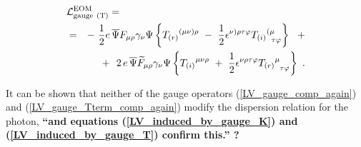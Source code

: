 \documentclass[paper,12pt]{revtex4}
\begin{document}
\begin{eqnarray}
\nonumber
        \lefteqn{
        \mathcal{L}_{\rm gauge\ (T)}^{\rm EOM} = } \\
\label{LV_induced_by_gauge_T}
	& = &
	-~ \frac{1}{2} e \, \overline{\Psi} F_{\mu\rho} 
	                    \gamma_\nu \Psi 
	\left\{
	{T_{(r)}}^{(\mu\nu)\rho} 
	~-~
	\frac{1}{2} \epsilon^{\nu)\rho\tau\varphi}
	{T_{(i)}}^{(\mu}_{\phantom{\mu}\tau\varphi}
	\right\}
	~~+
	\\
\nonumber
	&&
	+~~
	2\, 
	e\, \overline{\Psi} \widetilde{F}_{\mu\rho}
	        \gamma_\nu \Psi
	\left\{
	   {T_{(i)}}^{\mu\nu\rho} 
	   ~+~
	   \frac{1}{2} \epsilon^{\nu\rho\tau\varphi}
	   {T_{(r)}}^\mu_{\phantom{\mu}\tau\varphi}
	\right\}~.
\end{eqnarray}

	It can be shown 
\cite{GrootNibbelink:2004za}
	that neither of the gauge operators 
	(\ref{LV_gauge_comp_again}) and
	(\ref{LV_gauge_Tterm_comp_again}) 
	modify the dispersion relation for the photon,
	{\bf ``and equations (\ref{LV_induced_by_gauge_K})
	  and (\ref{LV_induced_by_gauge_T}) confirm this.'' ?}


\end{document}
